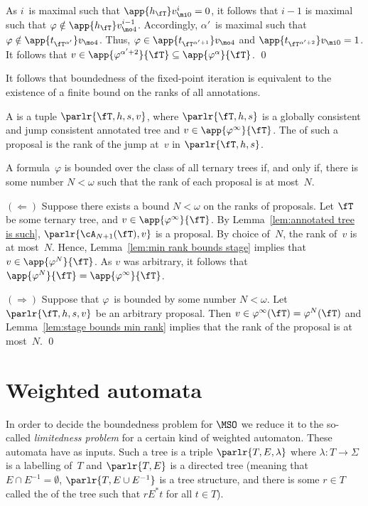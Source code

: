 \documentclass{LMCS}
\begin{document}
As $i$~is maximal such that $\app{h_{\fT}}v^i_{\mi0}=0$,
it follows that $i-1$ is maximal
such that $\varphi\notin\app{h_{\fT}}v^{i-1}_{\mo4}$.
Accordingly, $\alpha'$~is maximal such that
$\varphi\notin\app{t_{\fT^{\alpha'}}}v_{\mo4}$.
Thus, $\varphi\in\app{t_{\fT^{\alpha'+1}}}v_{\mo4}$
and $\app{t_{\fT^{\alpha'+2}}}v_{\mi0}=1$.
It follows that $v\in\app{\varphi^{\alpha'+2}}{\fT}\subseteq\app{\varphi^{\alpha}}{\fT}$.
\qed

It follows that boundedness of the fixed-point iteration
is equivalent to the existence of a finite bound on the ranks of all annotations.
\begin{defi}
A  is a tuple $\parlr{\fT,h,s,v}$,
where $\parlr{\fT,h,s}$
is a globally consistent and jump consistent annotated tree
and $v\in\app{\varphi^{\infty}}{\fT}$.
The  of such a proposal is the rank of the jump at~$v$ in $\parlr{\fT,h,s}$.
\end{defi}

\begin{prop}\label{prop: boundeness and ranks}
A formula~$\varphi$ is bounded over the class of all ternary trees
if, and only if, there is some number $N < \omega$
such that the rank of each proposal is at most~$N$.
\end{prop}

\proof
$(\Leftarrow)$ Suppose there exists a bound $N < \omega$ on the ranks of proposals.
Let $\fT$ be some ternary tree, and $v\in\app{\varphi^{\infty}}{\fT}$.
By Lemma~\ref{lem:annotated tree is such},
$\parlr{\cA_{N+1}(\fT),v}$ is a proposal.
By choice of~$N$, the rank of~$v$ is at most~$N$.
Hence, Lemma~\ref{lem:min rank bounds stage} implies that $v\in\app{\varphi^N}{\fT}$.
As $v$ was arbitrary, it follows that $\app{\varphi^N}{\fT}=\app{\varphi^{\infty}}{\fT}$.

$(\Rightarrow)$ Suppose that $\varphi$~is bounded by some number $N < \omega$.
Let $\parlr{\fT,h,s,v}$ be an arbitrary proposal.
Then $v \in \varphi^\infty(\fT) = \varphi^N(\fT)$
and Lemma~\ref{lem:stage bounds min rank} implies
that the rank of the proposal is at most~$N$.
\qed


\section{Weighted automata}
\label{sect:automata}
\label{sect:end I}

In order to decide the boundedness problem for $\MSO$
we reduce it to the so-called \emph{limitedness problem}
for a certain kind of weighted automaton.
These automata have  as inputs.
Such a tree is a triple $\parlr{T,E,\lambda}$
where $\lambda:T\to\Sigma$ is a labelling of~$T$
and $\parlr{T,E}$ is a directed tree
(meaning that $E\cap E^{-1}=\emptyset$,
$\parlr{T,E\cup E^{-1}}$ is a tree structure,
and there is some $r\in T$ called the  of the tree
such that $r \mathrel{E^*} t$ for all $t\in T$).
\end{document}
